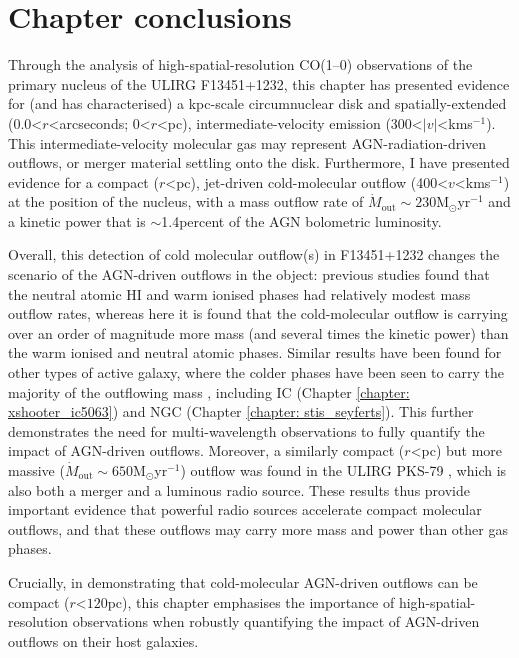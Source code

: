 \section{Chapter conclusions}
\label{section: alma_f13451_1232: conclusions}

Through the analysis of high-spatial-resolution CO(1--0) observations of the primary nucleus of the ULIRG F13451+1232, this chapter has presented evidence for (and has characterised) a kpc-scale circumnuclear disk and spatially-extended (0.0\;\textless\;$r$\;\textless{}\;arcseconds; 0\;\textless\;$r$\;\textless{}\;pc), intermediate-velocity emission (300\;\textless\;$|v|$\;\textless{}\;km\;s$^{-1}$). This intermediate-velocity molecular gas may represent AGN-radiation-driven outflows, or merger material settling onto the disk. Furthermore, I have presented evidence for a compact ($r$\;\textless{}\;pc), jet-driven cold-molecular outflow (400\;\textless\;$v$\;\textless{}\;km\;s$^{-1}$) at the position of the nucleus, with a mass outflow rate of $\dot{M}_\mathrm{out}\sim230$\;M$_\odot$\;yr$^{-1}$ and a kinetic power that is $\sim$1.4\;per\;cent of the AGN bolometric luminosity.

Overall, this detection of cold molecular outflow(s) in F13451+1232 changes the scenario of the AGN-driven outflows in the object: previous studies found that the neutral atomic HI and warm ionised phases had relatively modest mass outflow rates, whereas here it is found that the cold-molecular outflow is carrying over an order of magnitude more mass (and several times the kinetic power) than the warm ionised and neutral atomic phases. Similar results have been found for other types of active galaxy, where the colder phases have been seen to carry the majority of the outflowing mass \citep{RamosAlmeida2019, Speranza2024}, including IC (Chapter \ref{chapter: xshooter_ic5063}) and NGC (Chapter \ref{chapter: stis_seyferts}). This further demonstrates the need for multi-wavelength observations to fully quantify the impact of AGN-driven outflows. Moreover, a similarly compact ($r$\;\textless{}\;pc) but more massive ($\dot{M}_\mathrm{out}\sim650$\;M$_\odot$\;yr$^{-1}$) outflow was found in the ULIRG PKS-79 \citep{Oosterloo2019}, which is also both a merger and a luminous radio source. These results thus provide important evidence that powerful radio sources accelerate compact molecular outflows, and that these outflows may carry more mass and power than other gas phases.

Crucially, in demonstrating that cold-molecular AGN-driven outflows can be compact ($r$\;\textless\;$120$\;pc), this chapter emphasises the importance of high-spatial-resolution observations when robustly quantifying the impact of AGN-driven outflows on their host galaxies.

